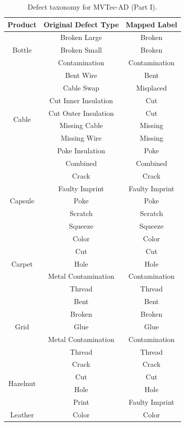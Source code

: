 \begin{table}
\centering
\footnotesize
\caption{Defect taxonomy for MVTec-AD (Part I).}
\label{tab:mvtec-mapping1}
\begin{tabular}{@{}ccc@{}}
\toprule
\textbf{Product} & \textbf{Original Defect Type} & \textbf{Mapped Label} \\
\midrule
\multirow{3}{*}{Bottle} & Broken Large & Broken \\
 & Broken Small & Broken \\
 & Contamination & Contamination \\
\midrule
\multirow{8}{*}{Cable} & Bent Wire & Bent \\
 & Cable Swap & Misplaced \\
 & Cut Inner Insulation & Cut \\
 & Cut Outer Insulation & Cut \\
 & Missing Cable & Missing \\
 & Missing Wire & Missing \\
 & Poke Insulation & Poke \\
 & Combined & Combined \\
\midrule
\multirow{5}{*}{Capsule} & Crack & Crack \\
 & Faulty Imprint & Faulty Imprint \\
 & Poke & Poke \\
 & Scratch & Scratch \\
 & Squeeze & Squeeze \\
\midrule
\multirow{5}{*}{Carpet} & Color & Color \\
 & Cut & Cut \\
 & Hole & Hole \\
 & Metal Contamination & Contamination \\
 & Thread & Thread \\
\midrule
\multirow{5}{*}{Grid} & Bent & Bent \\
 & Broken & Broken \\
 & Glue & Glue \\
 & Metal Contamination & Contamination \\
 & Thread & Thread \\
\midrule
\multirow{4}{*}{Hazelnut} & Crack & Crack \\
 & Cut & Cut \\
 & Hole & Hole \\
 & Print & Faulty Imprint \\
\midrule
\multirow{5}{*}{Leather} & Color & Color \\

\end{tabular}
\end{table}
